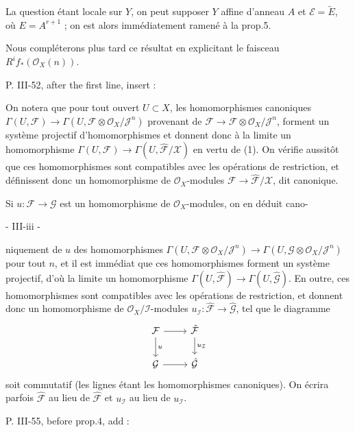La question étant locale sur $Y$, on peut supposer $Y$ affine d'anneau $A$ et $\mathcal{E} = \tilde{E}$, où $E = A^{r+1}$ ; on est alors immédiatement ramené à la prop.5.

Nous compléterons plus tard ce résultat en explicitant le faisceau $R^i f_*(\mathcal{O}_X(n))$.

P. III-52, after the first line, insert :

On notera que pour tout ouvert $U \subset X$, les homomorphismes canoniques $\Gamma(U, \mathcal{F}) \to \Gamma(U, \mathcal{F} \otimes \mathcal{O}_X / \mathcal{J}^n)$ provenant de $\mathcal{F} \to \mathcal{F} \otimes \mathcal{O}_X / \mathcal{J}^n$, forment un système projectif d'homomorphismes et donnent donc à la limite un homomorphisme $\Gamma(U, \mathcal{F}) \to \Gamma(U, \hat{\mathcal{F}}/\mathcal{X})$ en vertu de (1). On vérifie aussitôt que ces homomorphismes sont compatibles avec les opérations de restriction, et définissent donc un homomorphisme de $\mathcal{O}_X$-modules $\mathcal{F} \to \hat{\mathcal{F}}/\mathcal{X}$, dit canonique.

Si $u : \mathcal{F} \to \mathcal{G}$ est un homomorphisme de $\mathcal{O}_X$-modules, on en déduit cano-

\newpage


- III-iii -

niquement de $u$ des homomorphismes $\Gamma(U, \mathcal{F} \otimes \mathcal{O}_X/\mathcal{J}^n) \to \Gamma(U, \mathcal{G} \otimes \mathcal{O}_X/\mathcal{J}^n)$ pour tout $n$, et il est immédiat que ces homomorphismes forment un système projectif, d'où la limite un homomorphisme $\Gamma(U, \hat{\mathcal{F}}) \to \Gamma(U, \hat{\mathcal{G}})$. En outre, ces homomorphismes sont compatibles avec les opérations de restriction, et donnent donc un homomorphisme de $\mathcal{O}_X/\mathcal{I}$-modules $u_{\mathcal{I}} : \hat{\mathcal{F}} \to \hat{\mathcal{G}}$, tel que le diagramme
$$\begin{tikzcd}
\mathcal{F} \arrow[r] \arrow[d, "u"] & \hat{\mathcal{F}} \arrow[d, "u_{\mathcal{I}}"] \\
\mathcal{G} \arrow[r] & \hat{\mathcal{G}}
\end{tikzcd}$$
soit commutatif (les lignes étant les homomorphismes canoniques).
On écrira parfois $\hat{\mathcal{F}}$ au lieu de $\hat{\mathcal{F}}$ et $u_{\mathcal{I}}$ au lieu de $u_{\mathcal{I}}$.

P. III-55, before prop.4, add :

